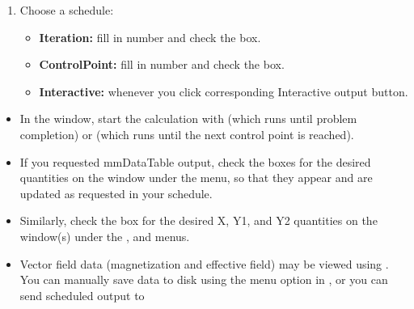 \begin{list}{}{\setlength{\labelwidth}{0pt}
               \setlength{\leftmargin}{0pt}
               \setlength{\rightmargin}{\leftmargin}
               \setlength{\itemsep}{0pt}}
\begin{description}
\begin{itemize}
\begin{itemize}
\begin{enumerate}
          \item Choose a schedule:
          \begin{itemize}
            \item {\bf Iteration:} fill in number and check the box.
            \item {\bf ControlPoint:} fill in number and check the box.
            \item {\bf Interactive:} whenever you click corresponding
                  Interactive output button.
          \end{itemize}
        \end{enumerate}
      \end{itemize}
    \end{itemize}
    \item[Start calculation:]\blankspace
    \begin{itemize}
      \item In the  window, start the calculation with
             (which runs until problem completion) or
             (which runs until the next control point is
            reached).
      \item If you requested mmDataTable output, check the boxes for the
            desired quantities on the
            window under
            the  menu, so that they appear and are updated as
            requested in your schedule.
      \item Similarly, check the box for the desired X, Y1, and Y2
            quantities on the
            window(s) under the ,  and  menus.
    \end{itemize}
    \item[Save and/or display results:]\blankspace
    \begin{itemize}
      \item Vector field data (magnetization and effective field) may be
            viewed using .  You can
            manually save data to disk using
            the  menu option in
            , or you can send scheduled output to

\end{itemize}
\end{description}
\end{list}
